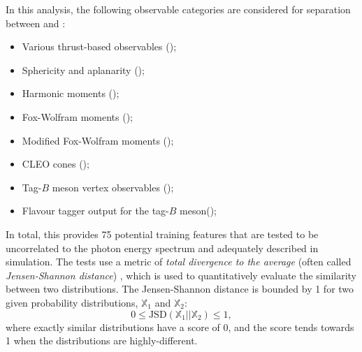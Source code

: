 In this analysis, the following observable categories are considered for separation between \epem\ra\qqbar and \BtoXsgamma:
\begin{itemize}
    \item Various thrust-based observables ();
    \item Sphericity and aplanarity ();
    \item Harmonic moments ();
    \item Fox-Wolfram moments ();
    \item Modified Fox-Wolfram moments ();
    \item CLEO cones ();
    \item Tag-$B$ meson vertex observables ();
    \item Flavour tagger output for the tag-$B$ meson();
\end{itemize}

In total, this provides 75 potential training features that are tested to be uncorrelated to the photon energy spectrum and adequately described in simulation.
The tests use a metric of \textit{total divergence to the average} (often called \textit{Jensen-Shannon distance}) \cite{Lin:1991abc},
which is used to quantitatively evaluate the similarity between two distributions.
The Jensen-Shannon distance is bounded by 1 for two given probability distributions, $\mathbb{X}_1$ and $\mathbb{X}_2$:
\begin{equation}\label{eq:js_distance}
    0\leq\mathrm{JSD}(\mathbb{X}_1||\mathbb{X}_2) \leq1,
\end{equation}
where exactly similar distributions have a score of 0, and the score tends towards 1 when the distributions are highly-different.

